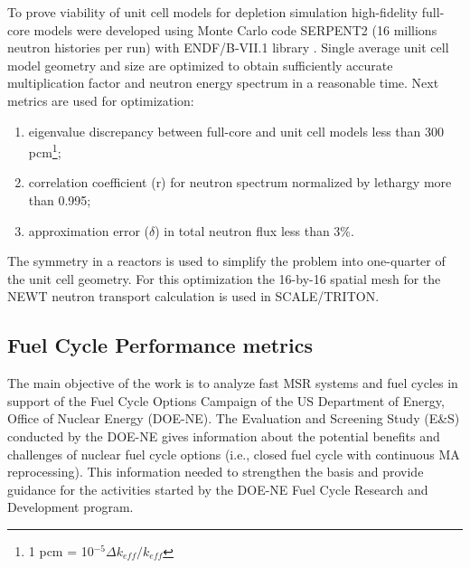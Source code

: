 \documentclass{anstrans}
\begin{document}
To prove viability of unit cell models for depletion simulation high-fidelity full-core models were developed using Monte Carlo code SERPENT2 (16 millions neutron histories per run) with ENDF/B-VII.1 library \cite{leppanen_serpent_2015, chadwick_endf/b-vii.1_2011}. Single average unit cell model geometry and size are optimized to obtain sufficiently accurate multiplication factor and neutron energy spectrum in a reasonable time. Next metrics are used for optimization:
\vspace{-0.08in}
\begin{enumerate}
	\item eigenvalue discrepancy between full-core and unit cell models less than 300 pcm\footnote{ 1 pcm = 10$^{-5}\Delta k_{eff}/k_{eff}$};\vspace{-0.11in}
	\item correlation coefficient (r) for neutron spectrum normalized by lethargy more than 0.995;\vspace{-0.11in}
	\item approximation error ($\delta$) in total neutron flux less than 3\%.\vspace{-0.08in}
\end{enumerate}
The symmetry in a reactors is used to simplify the problem into one-quarter of the unit cell geometry. For this optimization the 16-by-16 spatial mesh for the NEWT neutron transport calculation is used in SCALE/TRITON.

\subsection{Fuel Cycle Performance metrics} 
\label{sec:metrics}
The main objective of the work is to analyze fast \gls{MSR} systems and fuel cycles in support of the Fuel Cycle Options Campaign of the US Department of Energy, Office of Nuclear Energy (DOE-NE). The Evaluation and Screening Study (E\&S) conducted by the DOE-NE gives information about the potential benefits and challenges of nuclear fuel cycle options (i.e., closed fuel cycle with continuous \gls{MA} reprocessing). This information needed to strengthen the basis and provide guidance for the activities started by the DOE-NE Fuel Cycle Research and Development program.
\end{document}

